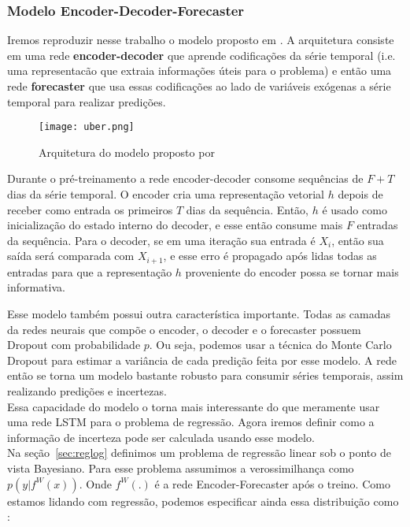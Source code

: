 \subsubsection{Modelo Encoder-Decoder-Forecaster}

Iremos reproduzir nesse trabalho o modelo proposto em \cite{ubertime}. A
arquitetura consiste em uma rede \textbf{encoder-decoder} que aprende codificações da
série temporal (i.e. uma representacão que extraia informações úteis para o
problema) e então uma rede \textbf{forecaster} que usa essas codificações ao lado de
variáveis exógenas a série temporal para realizar predições.  


\begin{figure}[H]
\centering
\texttt{[image: uber.png]}
\caption{Arquitetura do modelo proposto por \cite{ubertime}}
\end{figure}


Durante o pré-treinamento a rede encoder-decoder consome sequências de $F + T$ dias
da série temporal. O encoder cria uma representação vetorial $h$ depois de
receber como entrada os primeiros $T$ dias da sequência. Então, $h$ é usado como
inicialização do estado interno do decoder, e esse então consume mais $F$
entradas da sequência. Para o decoder, se em uma iteração sua entrada é $X_i$,
então sua saída será comparada com $X_{i+1}$, e esse erro é propagado após lidas
todas as entradas para que a representação $h$ proveniente do encoder possa se
tornar mais informativa.


Esse modelo também possui outra característica importante. Todas as camadas da
redes neurais que compõe o encoder, o decoder e o forecaster possuem
Dropout com probabilidade $p$. Ou seja, podemos usar a técnica do Monte
Carlo Dropout para estimar a variância de cada predição feita por esse modelo. A
rede então se torna um modelo bastante robusto para consumir séries temporais,
assim realizando predições e incertezas.\\


Essa capacidade do modelo o torna mais interessante do que meramente usar uma
rede LSTM para o problema de regressão. Agora iremos definir como a informação
de incerteza pode ser calculada usando esse modelo. \\

Na seção~\ref{sec:reglog} definimos um problema de regressão linear sob o ponto
de vista Bayesiano. Para esse problema assumimos a verossimilhança como $p(y |f^W(x))$.
Onde $f^W(.)$ é a rede Encoder-Forecaster após o treino.
Como estamos lidando com regressão, podemos especificar ainda essa distribuição
como \citep{ubertime}:  

